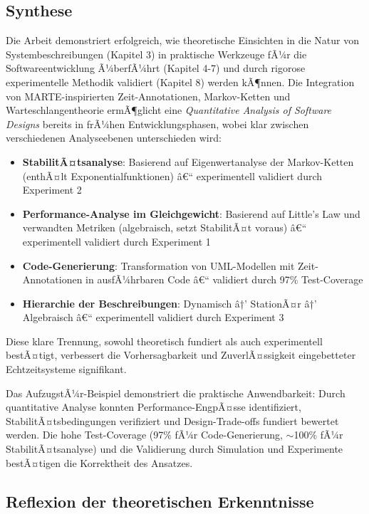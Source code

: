 ﻿\documentclass[a4paper,12pt]{report}
\theoremstyle{definition}
\begin{document}
\subsection{Synthese}

Die Arbeit demonstriert erfolgreich, wie theoretische Einsichten in die Natur von Systembeschreibungen (Kapitel 3) in praktische Werkzeuge fÃ¼r die Softwareentwicklung Ã¼berfÃ¼hrt (Kapitel 4-7) und durch rigorose experimentelle Methodik validiert (Kapitel 8) werden kÃ¶nnen. Die Integration von MARTE-inspirierten Zeit-Annotationen, Markov-Ketten und Warteschlangentheorie ermÃ¶glicht eine \textit{Quantitative Analysis of Software Designs} bereits in frÃ¼hen Entwicklungsphasen, wobei klar zwischen verschiedenen Analyseebenen unterschieden wird:

\begin{itemize}
	\item[-] \textbf{StabilitÃ¤tsanalyse}: Basierend auf Eigenwertanalyse der Markov-Ketten (enthÃ¤lt Exponentialfunktionen) â€“ experimentell validiert durch Experiment 2
	\item[-] \textbf{Performance-Analyse im Gleichgewicht}: Basierend auf Little's Law und verwandten Metriken (algebraisch, setzt StabilitÃ¤t voraus) â€“ experimentell validiert durch Experiment 1
	\item[-] \textbf{Code-Generierung}: Transformation von UML-Modellen mit Zeit-Annotationen in ausfÃ¼hrbaren Code â€“ validiert durch 97\% Test-Coverage
	\item[-] \textbf{Hierarchie der Beschreibungen}: Dynamisch â†’ StationÃ¤r â†’ Algebraisch â€“ experimentell validiert durch Experiment 3
\end{itemize}

Diese klare Trennung, sowohl theoretisch fundiert als auch experimentell bestÃ¤tigt, verbessert die Vorhersagbarkeit und ZuverlÃ¤ssigkeit eingebetteter Echtzeitsysteme signifikant.

Das AufzugstÃ¼r-Beispiel demonstriert die praktische Anwendbarkeit: Durch quantitative Analyse konnten Performance-EngpÃ¤sse identifiziert, StabilitÃ¤tsbedingungen verifiziert und Design-Trade-offs fundiert bewertet werden. Die hohe Test-Coverage (97\% fÃ¼r Code-Generierung, $\sim$100\% fÃ¼r StabilitÃ¤tsanalyse) und die Validierung durch Simulation und Experimente bestÃ¤tigen die Korrektheit des Ansatzes.

\subsection{Reflexion der theoretischen Erkenntnisse}
\end{document}
